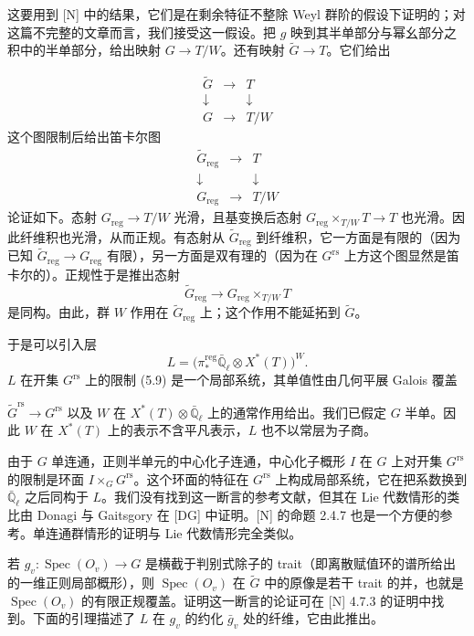 这要用到 [N] 中的结果，它们是在剩余特征不整除 Weyl 群阶的假设下证明的；对这篇不完整的文章而言，我们接受这一假设。把 $g$ 映到其半单部分与幂幺部分之积中的半单部分，给出映射 $G\to T/W$。还有映射 $\tilde G\to T$。它们给出

\[
\begin{array}{ccc}
\tilde G&\longrightarrow&T\\
\downarrow&&\downarrow\\
G&\longrightarrow&T/W
\end{array}
\]
这个图限制后给出笛卡尔图
\[
\begin{array}{ccc}
\tilde G_{\mathrm{reg}}&\longrightarrow&T\\
\downarrow&&\downarrow\\
G_{\mathrm{reg}}&\longrightarrow&T/W
\end{array}
\]
论证如下。态射 $G_{\mathrm{reg}}\to T/W$ 光滑，且基变换后态射 $G_{\mathrm{reg}}\times_{T/W}T\to T$ 也光滑。因此纤维积也光滑，从而正规。有态射从 $\tilde G_{\mathrm{reg}}$ 到纤维积，它一方面是有限的（因为已知 $\tilde G_{\mathrm{reg}}\to G_{\mathrm{reg}}$ 有限），另一方面是双有理的（因为在 $G^{\mathrm{rs}}$ 上方这个图显然是笛卡尔的）。正规性于是推出态射
\[
\tilde G_{\mathrm{reg}}\to G_{\mathrm{reg}}\times_{T/W}T
\]
是同构。由此，群 $W$ 作用在 $\tilde G_{\mathrm{reg}}$ 上；这个作用不能延拓到 $\tilde G$。

于是可以引入层
\[
L=\bigl(\pi^{\mathrm{reg}}_*\bar{\mathbb Q}_\ell\otimes X^*(T)\bigr)^W.
\]
$L$ 在开集 $G^{\mathrm{rs}}$ 上的限制 (5.9) 是一个局部系统，其单值性由几何平展 Galois 覆盖

$\tilde G^{\mathrm{rs}}\to G^{\mathrm{rs}}$ 以及 $W$ 在 $X^*(T)\otimes\bar{\mathbb Q}_\ell$ 上的通常作用给出。我们已假定 $G$ 半单。因此 $W$ 在 $X^*(T)$ 上的表示不含平凡表示，$L$ 也不以常层为子商。

由于 $G$ 单连通，正则半单元的中心化子连通，中心化子概形 $I$ 在 $G$ 上对开集 $G^{\mathrm{rs}}$ 的限制是环面 $I\times_GG^{\mathrm{rs}}$。这个环面的特征在 $G^{\mathrm{rs}}$ 上构成局部系统，它在把系数换到 $\bar{\mathbb Q}_\ell$ 之后同构于 $L$。我们没有找到这一断言的参考文献，但其在 Lie 代数情形的类比由 Donagi 与 Gaitsgory 在 [DG] 中证明。[N] 的命题 2.4.7 也是一个方便的参考。单连通群情形的证明与 Lie 代数情形完全类似。

若 $g_v:\operatorname{Spec}(O_v)\to G$ 是横截于判别式除子的 trait（即离散赋值环的谱所给出的一维正则局部概形），则 $\operatorname{Spec}(O_v)$ 在 $\tilde G$ 中的原像是若干 trait 的并，也就是 $\operatorname{Spec}(O_v)$ 的有限正规覆盖。证明这一断言的论证可在 [N] 4.7.3 的证明中找到。下面的引理描述了 $L$ 在 $g_v$ 的约化 $\bar g_v$ 处的纤维，它由此推出。

